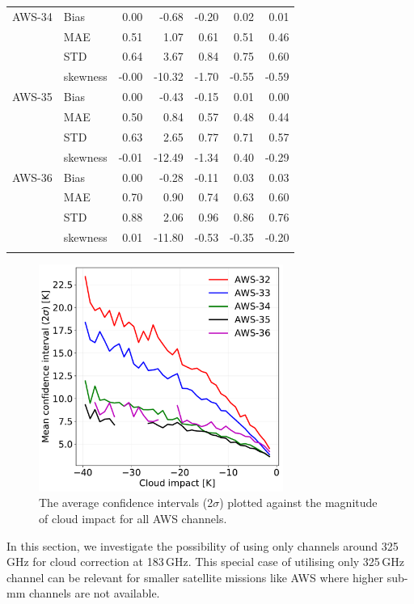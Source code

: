 \documentclass[amt, manuscript]{copernicus}
\begin{document}
\begin{table}[t]
\begin{tabular}{llrr|rrr}
		\middlehline
		AWS-34	&Bias     &  0.00 &  -0.68 & -0.20 &  0.02 &  0.01 \\
				&MAE      &  0.51 &   1.07 &  0.61 &  0.51 &  0.46 \\
				&STD      &  0.64 &   3.67 &  0.84 &  0.75 &  0.60 \\
				&skewness & -0.00 & -10.32 & -1.70 & -0.55 & -0.59 \\
		\middlehline
		AWS-35	&Bias     &  0.00 &  -0.43 & -0.15 & 0.01 &  0.00 \\
				&MAE      &  0.50 &   0.84 &  0.57 & 0.48 &  0.44 \\
				&STD      &  0.63 &   2.65 &  0.77 & 0.71 &  0.57 \\
				&skewness & -0.01 & -12.49 & -1.34 & 0.40 & -0.29 \\
		\middlehline
		AWS-36  &Bias     & 0.00 &  -0.28 & -0.11 &  0.03 &  0.03 \\
				&MAE      & 0.70 &   0.90 &  0.74 &  0.63 &  0.60 \\
				&STD      & 0.88 &   2.06 &  0.96 &  0.86 &  0.76 \\
				&skewness & 0.01 & -11.80 & -0.53 & -0.35 & -0.20 \\
		\bottomhline				
	\end{tabular}
	\belowtable{} %
\end{table}
\begin{figure}[t]
	\includegraphics[width = 80mm]{Figures/cloud_impact_uncertainty_AWS.pdf}	
	\caption{The average confidence intervals (2$\sigma$) plotted against the magnitude of cloud impact for all AWS channels.}
	\label{fig:uncertainty_cloud_impact}	
\end{figure}

In this section, we investigate the possibility of using only channels around 325\,GHz for cloud correction at 183\,GHz. This special case of utilising only 325\,GHz channel can be relevant for smaller satellite missions like AWS where higher sub-mm channels are not available. 
\end{document}
